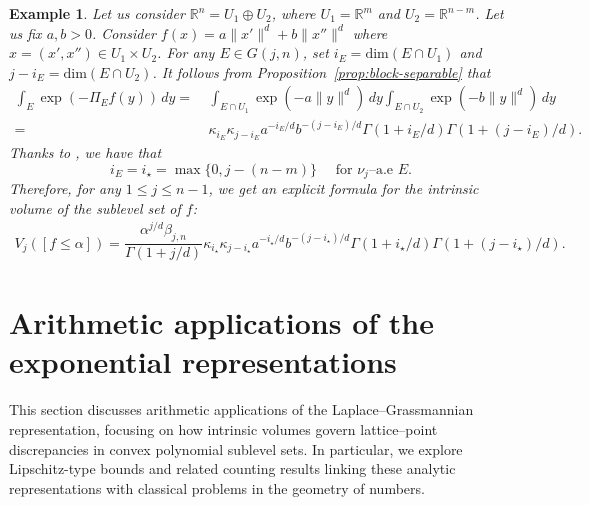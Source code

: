 \documentclass[11pt]{article}
\newtheorem{example}[theorem]{Example}
\theoremstyle{definition}
\numberwithin{equation}{section}
\newcommand{\R}{\mathbb{R}}
\newcommand{\Z}{\mathbb{Z}}
\newcommand{\Gr}[2]{G(#1,#2)}        %
\DeclareMathOperator{\vol}{vol}
\begin{document}
\begin{example}\normalfont
Let us consider $\R^n = U_1 \oplus U_2$, where $U_1 = \R^m$ and $U_2 = \R^{n - m}$.
Let us fix $a, b > 0$.
Consider $f(x) = a \| x' \|^d + b \| x'' \|^d$ where $x = (x', x'') \in U_1 \times U_2$.
For any $E \in \Gr{j}{n}$, set $i_E = \mathrm{dim} (E \cap U_1)$ and $j - i_E = \mathrm{dim}(E \cap U_2)$.
It follows from Proposition~\ref{prop:block-separable} that
\begin{align*}
    \int_E \exp(- \Pi_E f(y)) \, dy 
    = & ~ 
    \int_{E \cap U_1} \exp(- a \| y \|^d) \, dy \int_{E \cap U_2} \exp(- b\| y \|^d) \, dy \\
    = & ~
    \kappa_{i_E} \kappa_{j - i_E}a^{-i_E/d}b^{-(j - i_E)/d}\Gamma(1 + i_E/d)\Gamma(1 + (j - i_E)/d).
\end{align*}
Thanks to \cite[Lemma 13.2.1]{SW_2008}, we have that 
\[
i_E = i_\star = \max \{ 0, j - (n - m) \} \quad \text{ for $\nu_j$--a.e $E$.}
\]
Therefore, for any $1 \leq j \leq n - 1$, we get an explicit formula for the intrinsic volume of the sublevel set of $f$:
\begin{align*}
    V_j([f \leq \alpha]) = \dfrac{\alpha^{j/d}\beta_{j, n}}{\Gamma(1 + j/d)} \kappa_{i_\star} \kappa_{j - i_\star} a^{-i_\star/d} b^{-(j - i_\star)/d} \Gamma(1 + i_\star/d) \Gamma(1 + (j - i_\star)/d).
\end{align*}
\end{example}

\section{Arithmetic applications of the exponential representations}
\label{sec:arith-applications}

This section discusses arithmetic applications of the Laplace–Grassmannian representation, focusing on how intrinsic volumes govern lattice–point discrepancies in convex polynomial sublevel sets. 
In particular, we explore Lipschitz-type bounds and related counting results linking these analytic representations with classical problems in the geometry of numbers.

\medskip

\end{document}
